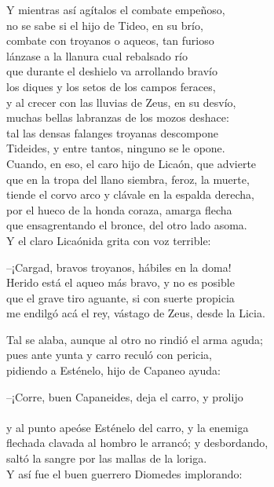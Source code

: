 Y mientras así agítalos el combate empeñoso,\\
no se sabe si el hijo de Tideo, en su brío,\\
combate con troyanos o aqueos, tan furioso\\
lánzase a la llanura cual rebalsado río\\
que durante el deshielo va arrollando bravío\\
los diques y los setos de los campos feraces,\\
y al crecer con las lluvias de Zeus, en su desvío,\\
muchas bellas labranzas de los mozos deshace:\\
tal las densas falanges troyanas descompone\\
Tideides, y entre tantos, ninguno se le opone.\\
Cuando, en eso, el caro hijo de Licaón, que advierte\\
que en la tropa del llano siembra, feroz, la muerte,\\
tiende el corvo arco y clávale en la espalda derecha,\\
por el hueco de la honda coraza, amarga flecha\\
que ensagrentando el bronce, del otro lado asoma.\\
Y el claro Licaónida grita con voz terrible:\par
--¡Cargad, bravos troyanos, hábiles en la doma!\\
Herido está el aqueo más bravo, y no es posible\\
que el grave tiro aguante, si con suerte propicia\\
me endilgó acá el rey, vástago de Zeus, desde la Licia.\par
Tal se alaba, aunque al otro no rindió el arma aguda;\\
pues ante yunta y carro reculó con pericia,\\
pidiendo a Esténelo, hijo de Capaneo ayuda:\par
--¡Corre, buen Capaneides, deja el carro, y prolijo\\
\\
y al punto apeóse Esténelo del carro, y la enemiga\\
flechada clavada al hombro le arrancó; y desbordando,\\
saltó la sangre por las mallas de la loriga.\\
Y así fue el buen guerrero Diomedes implorando:\par
